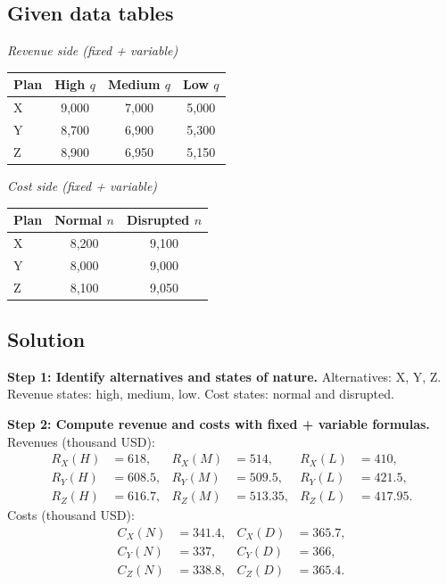\begin{ExamProblems}
		\subsection*{Given data tables}
		\begin{center}
			\begin{minipage}[t]{0.48\linewidth}
				\textit{Revenue side (fixed + variable)}
				\begin{center}
					\begin{tabular}{l c c c}
						\toprule
						Plan & High $q$ & Medium $q$ & Low $q$ \\
						\midrule
						X & 9{,}000 & 7{,}000 & 5{,}000 \\
						Y & 8{,}700 & 6{,}900 & 5{,}300 \\
						Z & 8{,}900 & 6{,}950 & 5{,}150 \\
						\bottomrule
					\end{tabular}
				\end{center}
			\end{minipage}
			\hfill
			\begin{minipage}[t]{0.48\linewidth}
				\textit{Cost side (fixed + variable)}
				\begin{center}
					\begin{tabular}{l c c}
						\toprule
						Plan & Normal $n$ & Disrupted $n$ \\
						\midrule
						X & 8{,}200 & 9{,}100 \\
						Y & 8{,}000 & 9{,}000 \\
						Z & 8{,}100 & 9{,}050 \\
						\bottomrule
					\end{tabular}
				\end{center}
			\end{minipage}
		\end{center}
		
		\subsection*{Solution}
		\textbf{Step 1: Identify alternatives and states of nature.} Alternatives: X, Y, Z. Revenue states: high, medium, low. Cost states: normal and disrupted.
		
		\textbf{Step 2: Compute revenue and costs with fixed + variable formulas.}
		Revenues (thousand USD):
		\[
		\begin{aligned}
		R_X(H)&=618, & R_X(M)&=514, & R_X(L)&=410,\\
		R_Y(H)&=608.5, & R_Y(M)&=509.5, & R_Y(L)&=421.5,\\
		R_Z(H)&=616.7, & R_Z(M)&=513.35, & R_Z(L)&=417.95.
		\end{aligned}
		\]
		Costs (thousand USD):
		\[
		\begin{aligned}
		C_X(N)&=341.4, & C_X(D)&=365.7,\\
		C_Y(N)&=337, & C_Y(D)&=366,\\
		C_Z(N)&=338.8, & C_Z(D)&=365.4.
		\end{aligned}
		\]
		

\end{ExamProblems}
